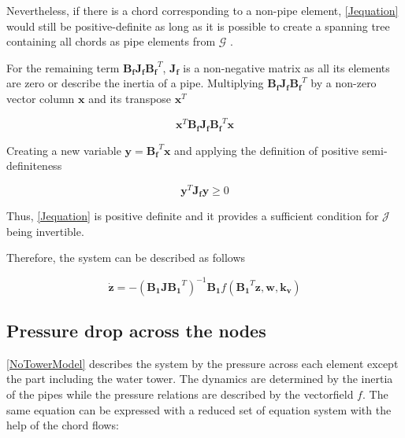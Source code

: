 Nevertheless, if there is a chord corresponding to a non-pipe element, \eqref{Jequation} 
would still be positive-definite as long as it is possible to create a spanning tree containing all chords as pipe elements from $\bm{\mathcal{G}}$ \cite{TowerModel}.

For the remaining term $\bm{B_f J_f {B_f}}^T$, $\bm{J_f}$ is a non-negative matrix as all its elements are zero or describe the inertia of a pipe. 
Multiplying $\bm{B_f J_f {B_f}}^T$ by a non-zero vector column $\mathbf{x}$ and its transpose $\mathbf{x}^{T}$

\begin{equation}
  \bm{x}^{T} \bm{B_f J_f {B_f}}^T \bm{x}
  \label{PosDefi}
\end{equation}

Creating a new variable $\bm{y} = \bm{B_f}^T \mathbf{x}$ and applying the definition of positive semi-definiteness 
\cite{MatrixBook}

\begin{equation}
  \bm{y}^{T} \bm{J_f y} \geqslant 0
  \label{PosDefEq}
\end{equation}

Thus, \eqref{Jequation} is positive definite and it provides a sufficient condition for $\bm{\mathcal{J}}$ being invertible. 

Therefore, the system can be described as follows

\begin{equation}
   \bm{\dot{z}}  = - (\bm{B_1 J {B_1}}^T)^{-1}\bm{B_1} f({\bm{B_1}}^T \bm{z},\bm{ w}, \bm{k_v})
   \label{ParatModelFinal}
 \end{equation}

\subsection{Pressure drop across the nodes}
\label{ModelRelationSection}



\eqref{NoTowerModel} describes the system by the pressure across each element except the part including the water tower. The dynamics are determined by the inertia of the pipes while the pressure relations are described by the vectorfield $f$. 
The same equation can be expressed with a reduced set of equation system with the help of the chord flows: 

